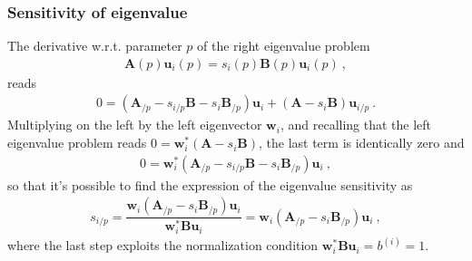 \documentclass[letterpaper,10pt,english]{jupyterBook}
\begin{document}
\subsubsection{Sensitivity of eigenvalue}
\label{\detokenize{ch/linear-algebra/spectral-sensitivity:sensitivity-of-eigenvalue}}
\sphinxAtStartPar
The derivative w.r.t. parameter \(p\) of the right eigenvalue problem
\begin{equation*}
\begin{split}\mathbf{A}(p) \mathbf{u}_i(p) = s_i(p) \mathbf{B}(p) \mathbf{u}_i(p) \ ,\end{split}
\end{equation*}
\sphinxAtStartPar
reads
\begin{equation*}
\begin{split}0 = ( \mathbf{A}_{/p} - s_{i/p} \mathbf{B} - s_i \mathbf{B}_{/p}) \mathbf{u}_i + (\mathbf{A} - s_i \mathbf{B} ) \mathbf{u}_{i/p} \ .\end{split}
\end{equation*}
\sphinxAtStartPar
Multiplying on the left by the left eigenvector \(\mathbf{w}_i\), and recalling that the left eigenvalue problem reads \(0 = \mathbf{w}_i^* \left( \mathbf{A} - s_i \mathbf{B} \right)\), the last term is identically zero and
\begin{equation*}
\begin{split}0 = \mathbf{w}_i^*  ( \mathbf{A}_{/p} - s_{i/p} \mathbf{B} - s_i \mathbf{B}_{/p}) \mathbf{u}_i \ ,\end{split}
\end{equation*}
\sphinxAtStartPar
so that it’s possible to find the expression of the eigenvalue sensitivity as
\begin{equation}\label{equation:ch/linear-algebra/spectral-sensitivity:eq:eig:sens:first:eval}
\begin{split}
s_{i/p}
  = \dfrac{\mathbf{w}_i \left( \mathbf{A}_{/p} - s_i \mathbf{B}_{/p} \right) \mathbf{u}_i}{\mathbf{w}_i^* \mathbf{B} \mathbf{u}_i} 
  = \mathbf{w}_i \left( \mathbf{A}_{/p} - s_i \mathbf{B}_{/p} \right) \mathbf{u}_i \ ,
\end{split}
\end{equation}
\sphinxAtStartPar
where the last step exploits the normalization condition \(\mathbf{w}_i^* \mathbf{B} \mathbf{u}_i = b^{(i)} = 1\).
\end{document}
